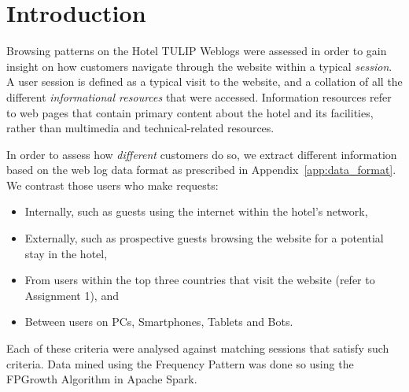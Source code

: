 \section{Introduction}
\label{sec:introduction}

Browsing patterns on the Hotel TULIP Weblogs were assessed in order to gain insight on how customers navigate through the website within a typical \textit{session}. A user session is defined as a typical visit to the website, and a collation of all the different \textit{informational resources} that were accessed. Information resources refer to web pages that contain primary content about the hotel and its facilities, rather than multimedia and technical-related resources.

In order to assess how \emph{different} customers do so, we extract different information based on the web log data format as prescribed in Appendix~\ref{app:data_format}. We contrast those users who make requests:

\begin{itemize}
  \item Internally, such as guests using the internet within the hotel's network,
  \item Externally, such as prospective guests browsing the website for a potential stay in the hotel,
  \item From users within the top three countries that visit the  website (refer to Assignment 1), and
  \item Between users on PCs, Smartphones, Tablets and Bots.
\end{itemize}

Each of these criteria were analysed against matching sessions that satisfy such criteria. Data mined using the Frequency Pattern was done so using the FPGrowth Algorithm in Apache Spark.
